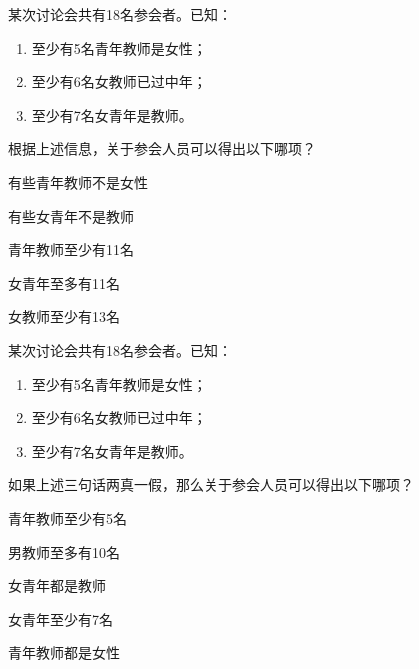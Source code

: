 \documentclass{exam-zh}
\begin{document}
\begin{question}
  某次讨论会共有18名参会者。已知：\begin{enumerate}
    \item 至少有5名青年教师是女性；
    \item 至少有6名女教师已过中年；
    \item 至少有7名女青年是教师。
  \end{enumerate}
  根据上述信息，关于参会人员可以得出以下哪项？ \paren

  \begin{choices}
    \item 有些青年教师不是女性
    \item 有些女青年不是教师
    \item 青年教师至少有11名
    \item 女青年至多有11名
    \item 女教师至少有13名
  \end{choices}
\end{question}

\begin{question}
  某次讨论会共有18名参会者。已知：\begin{enumerate}
    \item 至少有5名青年教师是女性；
    \item 至少有6名女教师已过中年；
    \item 至少有7名女青年是教师。
  \end{enumerate}
  如果上述三句话两真一假，那么关于参会人员可以得出以下哪项？ \paren

  \begin{choices}
    \item 青年教师至少有5名
    \item 男教师至多有10名
    \item 女青年都是教师
    \item 女青年至少有7名
    \item 青年教师都是女性
  \end{choices}
\end{question}

\end{document}
